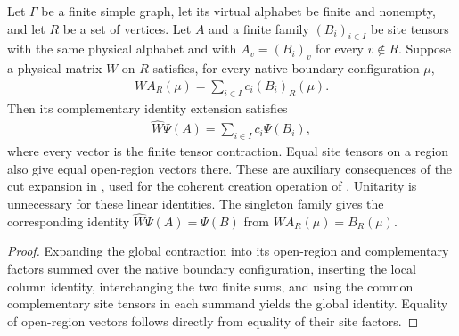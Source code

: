 \begin{lemma}%
    \label{thm:peps_regular_coherent_global_transport}
    \leanok
    Let $\Gamma$ be a finite simple graph, let its virtual alphabet be finite
    and nonempty, and let $R$ be a set of vertices. Let $A$ and a finite family
    $(B_i)_{i\in I}$ be site tensors with the same physical alphabet and with
    $A_v=(B_i)_v$ for every $v\notin R$. Suppose a physical matrix $W$ on $R$
    satisfies, for every native boundary configuration $\mu$,
    \begin{align}
        W A_R(\mu)=\sum_{i\in I}c_i(B_i)_R(\mu).
    \end{align}
    Then its complementary identity extension satisfies
    \begin{align}
        \widehat W\Psi(A)=\sum_{i\in I}c_i\Psi(B_i),
    \end{align}
    where every vector is the finite tensor contraction.
    Equal site tensors on a region also give equal open-region vectors there.
    These are auxiliary consequences of the cut expansion in
    \cite[Section~6.4]{Schuch2010PEPS}, used for the coherent creation operation
    of \cite[Theorem~6.17]{Schuch2010PEPS}. Unitarity is unnecessary for these
    linear identities. The singleton family gives the corresponding identity
    $\widehat W\Psi(A)=\Psi(B)$ from $WA_R(\mu)=B_R(\mu)$.
\end{lemma}

\begin{proof}\leanok
    Expanding the global contraction into its open-region and complementary
    factors summed over the native boundary configuration, inserting the local
    column identity, interchanging the two finite sums, and using the common
    complementary site tensors in each summand yields the global identity. Equality of open-region
    vectors follows directly from equality of their site factors.
\end{proof}
